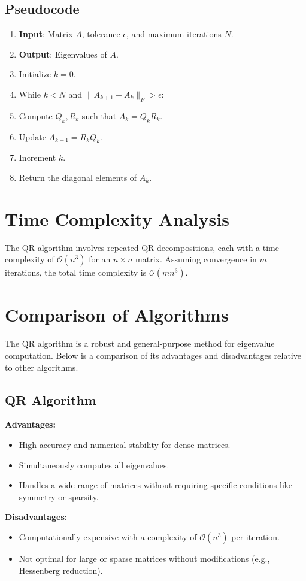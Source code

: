 \documentclass[12pt]{article}
\begin{document}
\subsection{Pseudocode}
\begin{enumerate}
    \item \textbf{Input}: Matrix $A$, tolerance $\epsilon$, and maximum iterations $N$.
    \item \textbf{Output}: Eigenvalues of $A$.
    \item Initialize $k = 0$.
    \item While $k < N$ and $\|A_{k+1} - A_k\|_F > \epsilon$:

        \item Compute $Q_k, R_k$ such that $A_k = Q_k R_k$.
        \item Update $A_{k+1} = R_k Q_k$.
        \item Increment $k$.

    \item Return the diagonal elements of $A_k$.
\end{enumerate}

\section{Time Complexity Analysis}
The QR algorithm involves repeated QR decompositions, each with a time complexity of $\mathcal{O}(n^3)$ for an $n \times n$ matrix. Assuming convergence in $m$ iterations, the total time complexity is $\mathcal{O}(m n^3)$. 
\section{Comparison of Algorithms}
The QR algorithm is a robust and general-purpose method for eigenvalue computation. Below is a comparison of its advantages and disadvantages relative to other algorithms.

\subsection{QR Algorithm}
\textbf{Advantages:}
\begin{itemize}
    \item High accuracy and numerical stability for dense matrices.
    \item Simultaneously computes all eigenvalues.
    \item Handles a wide range of matrices without requiring specific conditions like symmetry or sparsity.
\end{itemize}
\textbf{Disadvantages:}
\begin{itemize}
    \item Computationally expensive with a complexity of $\mathcal{O}(n^3)$ per iteration.
    \item Not optimal for large or sparse matrices without modifications (e.g., Hessenberg reduction).
\end{itemize}
\end{document}
